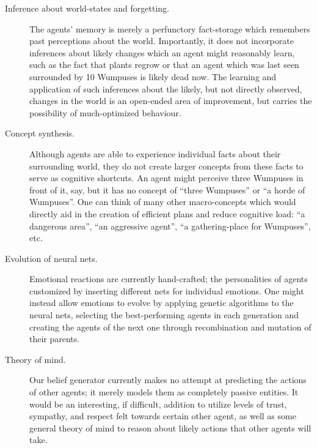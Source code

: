 \begin{description}
	 \item[Inference about world-states and forgetting.] The agents' memory is merely a perfunctory fact-storage which remembers past perceptions about the world. Importantly, it does not incorporate inferences about likely changes which an agent might reasonably learn, such as the fact that plants regrow or that an agent which was last seen surrounded by 10 Wumpuses is likely dead now. The learning and application of such inferences about the likely, but not directly observed, changes in the world is an open-ended area of improvement, but carries the possibility of much-optimized behaviour.
	 
	 \item[Concept synthesis.] Although agents are able to experience individual facts about their surrounding world, they do not create larger concepts from these facts to serve as cognitive shortcuts. An agent might perceive three Wumpuses in front of it, say, but it has no concept of ``three Wumpuses'' or ``a horde of Wumpuses''. One can think of many other macro-concepts which would directly aid in the creation of efficient plans and reduce cognitive load: ``a dangerous area'', ``an aggressive agent'', ``a gathering-place for Wumpuses'', etc.
	 
	 \item[Evolution of neural nets.] Emotional reactions are currently hand-crafted; the personalities of agents customized by inserting different nets for individual emotions. One might instead allow emotions to evolve by applying genetic algorithms to the neural nets, selecting the best-performing agents in each generation and creating the agents of the next one through recombination and mutation of their parents.
	 
	 \item[Theory of mind.] Our belief generator currently makes no attempt at predicting the actions of other agents; it merely models them as completely passive entities. It would be an interesting, if difficult, addition to utilize levels of trust, sympathy, and respect felt towards certain other agent, as well as some general theory of mind to reason about likely actions that other agents will take.
\end{description}
